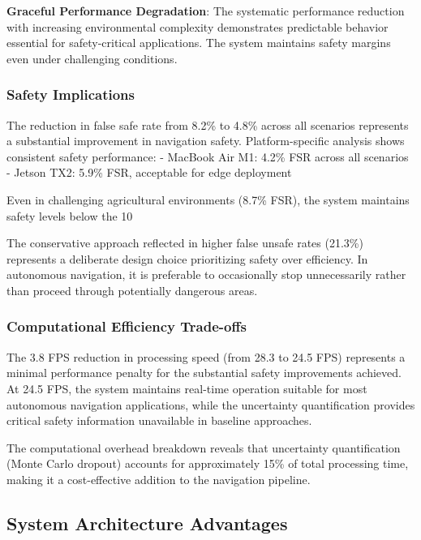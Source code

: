 \documentclass[10pt]{article}
\begin{document}
\textbf{Graceful Performance Degradation}: The systematic performance reduction with increasing environmental complexity demonstrates predictable behavior essential for safety-critical applications. The system maintains safety margins even under challenging conditions.

\subsubsection{Safety Implications}

The reduction in false safe rate from 8.2\% to 4.8\% across all scenarios represents a substantial improvement in navigation safety. Platform-specific analysis shows consistent safety performance:
- MacBook Air M1: 4.2\% FSR across all scenarios
- Jetson TX2: 5.9\% FSR, acceptable for edge deployment

Even in challenging agricultural environments (8.7\% FSR), the system maintains safety levels below the 10%

The conservative approach reflected in higher false unsafe rates (21.3\%) represents a deliberate design choice prioritizing safety over efficiency. In autonomous navigation, it is preferable to occasionally stop unnecessarily rather than proceed through potentially dangerous areas.

\subsubsection{Computational Efficiency Trade-offs}

The 3.8 FPS reduction in processing speed (from 28.3 to 24.5 FPS) represents a minimal performance penalty for the substantial safety improvements achieved. At 24.5 FPS, the system maintains real-time operation suitable for most autonomous navigation applications, while the uncertainty quantification provides critical safety information unavailable in baseline approaches.

The computational overhead breakdown reveals that uncertainty quantification (Monte Carlo dropout) accounts for approximately 15\% of total processing time, making it a cost-effective addition to the navigation pipeline.

\subsection{System Architecture Advantages}
\end{document}

